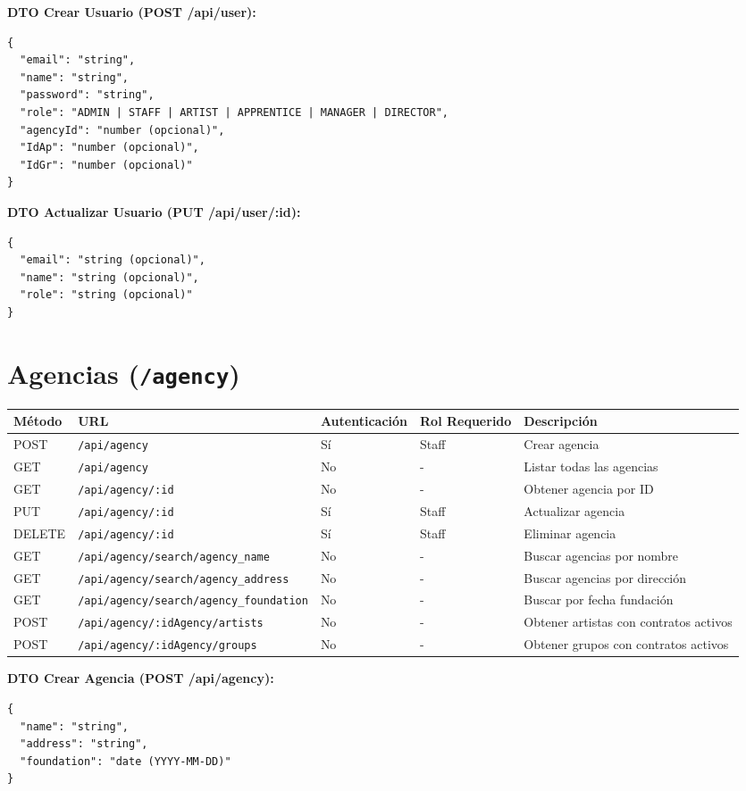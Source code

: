 \documentclass[11pt]{article}
\begin{document}
\textbf{DTO Crear Usuario (POST /api/user):}
\begin{Verbatim}
{
  "email": "string",
  "name": "string",
  "password": "string",
  "role": "ADMIN | STAFF | ARTIST | APPRENTICE | MANAGER | DIRECTOR",
  "agencyId": "number (opcional)",
  "IdAp": "number (opcional)",
  "IdGr": "number (opcional)"
}
\end{Verbatim}

\textbf{DTO Actualizar Usuario (PUT /api/user/:id):}
\begin{Verbatim}
{
  "email": "string (opcional)",
  "name": "string (opcional)",
  "role": "string (opcional)"
}
\end{Verbatim}

\section{Agencias (\texttt{/agency})}

\begin{longtable}{lllll}
\toprule
\textbf{Método} & \textbf{URL} & \textbf{Autenticación} & \textbf{Rol Requerido} & \textbf{Descripción} \\
\midrule
\endhead
POST & \texttt{/api/agency} & Sí & Staff & Crear agencia \\
GET & \texttt{/api/agency} & No & - & Listar todas las agencias \\
GET & \texttt{/api/agency/:id} & No & - & Obtener agencia por ID \\
PUT & \texttt{/api/agency/:id} & Sí & Staff & Actualizar agencia \\
DELETE & \texttt{/api/agency/:id} & Sí & Staff & Eliminar agencia \\
GET & \texttt{/api/agency/search/agency\_name} & No & - & Buscar agencias por nombre \\
GET & \texttt{/api/agency/search/agency\_address} & No & - & Buscar agencias por dirección \\
GET & \texttt{/api/agency/search/agency\_foundation} & No & - & Buscar por fecha fundación \\
POST & \texttt{/api/agency/:idAgency/artists} & No & - & Obtener artistas con contratos activos \\
POST & \texttt{/api/agency/:idAgency/groups} & No & - & Obtener grupos con contratos activos \\
\bottomrule
\end{longtable}

\textbf{DTO Crear Agencia (POST /api/agency):}
\begin{Verbatim}
{
  "name": "string",
  "address": "string",
  "foundation": "date (YYYY-MM-DD)"
}
\end{Verbatim}
\end{document}
